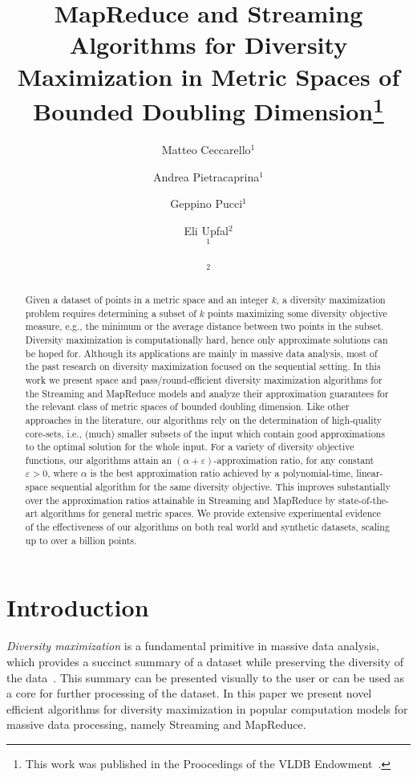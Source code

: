 \documentclass{article}
\title{
  MapReduce and Streaming Algorithms for Diversity Maximization in 
  Metric Spaces of Bounded Doubling Dimension\footnote{This work was published in the Proocedings of the VLDB Endowment~\cite{CeccarelloPPU17}.}
}
\date{}
\author{
  Matteo Ceccarello$^1$\and
  Andrea Pietracaprina$^1$ \and
  Geppino Pucci$^1$\and
  Eli Upfal$^2$
  \\
  $^1$\affaddr{Department of Information Engineering, University of Padova,
    Padova, Italy}\\
  \email{\{ceccarel,capri,geppo\}@dei.unipd.it}
  \\
  $^2$\affaddr{Department of Computer Science,
    Brown University, Providence, RI USA}\\
  \email{eli\_upfal@brown.edu}
}
\renewcommand{\epsilon}{\varepsilon}
\begin{document}
\maketitle

\begin{abstract}
Given a dataset of points in a metric space and an integer $k$, a
diversity maximization problem requires determining a subset of $k$
points maximizing some diversity objective measure, e.g., the minimum
or the average distance between two points in the subset.
Diversity maximization is computationally hard, hence only approximate
solutions can be hoped for. Although its applications are mainly in
massive data analysis, most of the past research on diversity
maximization focused on the sequential setting.  In
this work we present space and pass/round-efficient 
diversity maximization algorithms for the
Streaming and MapReduce models and analyze their approximation
guarantees for the relevant class of metric spaces of bounded doubling
dimension. Like other approaches in the literature, our algorithms
rely on the determination of high-quality core-sets, i.e.,
(much) smaller subsets of the input which contain good approximations
to the optimal solution for the whole input. For a variety of
diversity objective functions, our algorithms attain an
$(\alpha+\epsilon)$-approximation ratio, for any constant
$\epsilon>0$, where $\alpha$ is the best approximation ratio achieved
by a polynomial-time, linear-space sequential algorithm for the same
diversity objective.  This improves substantially  over
the approximation ratios attainable in Streaming and MapReduce
by state-of-the-art algorithms for general metric
spaces. We provide extensive experimental evidence of the
effectiveness of our algorithms on both
real world and synthetic datasets, scaling up to over a
billion points.
\end{abstract}

\section{Introduction}

\emph{Diversity maximization} is a fundamental primitive in massive
data analysis, which provides a succinct summary 
of a dataset while preserving the diversity of the
data~\cite{AbbassiMT13,MasinB08,wu2013,YangMNFCH15}. This summary can be presented visually to the user or can be used as a core for further processing of the dataset. In this paper we present novel efficient algorithms for diversity
maximization in popular computation models for massive data processing,
namely Streaming and MapReduce.
\end{document}
